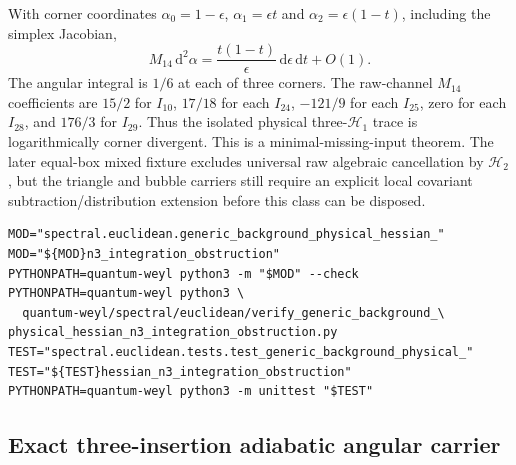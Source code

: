 \documentclass[11pt]{article}
\theoremstyle{definition}
\theoremstyle{remark}
\newcommand{\dd}{\mathrm d}
\begin{document}
With corner coordinates
$\alpha_0=1-\epsilon$, $\alpha_1=\epsilon t$ and
$\alpha_2=\epsilon(1-t)$, including the simplex Jacobian,
\[
 M_{14}\,\dd^2\alpha
 =\frac{t(1-t)}{\epsilon}\,\dd\epsilon\,\dd t+O(1).
\]
The angular integral is $1/6$ at each of three corners.  The raw-channel
$M_{14}$ coefficients are $15/2$ for $I_{10}$, $17/18$ for each $I_{24}$,
$-121/9$ for each $I_{25}$, zero for each $I_{28}$, and $176/3$ for
$I_{29}$.  Thus the isolated physical three-$\mathcal H_1$ trace is
logarithmically corner divergent.  This is a minimal-missing-input theorem.
The later equal-box mixed fixture excludes universal raw algebraic
cancellation by $\mathcal H_2$, but the triangle and bubble carriers still
require an explicit local covariant subtraction/distribution extension before
this class can be disposed.

\begin{verbatim}
MOD="spectral.euclidean.generic_background_physical_hessian_"
MOD="${MOD}n3_integration_obstruction"
PYTHONPATH=quantum-weyl python3 -m "$MOD" --check
PYTHONPATH=quantum-weyl python3 \
  quantum-weyl/spectral/euclidean/verify_generic_background_\
physical_hessian_n3_integration_obstruction.py
TEST="spectral.euclidean.tests.test_generic_background_physical_"
TEST="${TEST}hessian_n3_integration_obstruction"
PYTHONPATH=quantum-weyl python3 -m unittest "$TEST"
\end{verbatim}

\subsection{Exact three-insertion adiabatic angular carrier}
\end{document}
